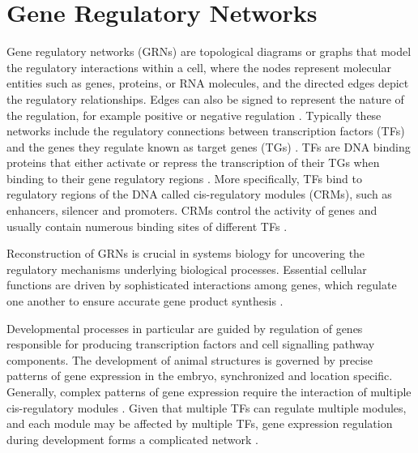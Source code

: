 \section{Gene Regulatory Networks}
Gene regulatory networks (GRNs) are topological diagrams or graphs that model the regulatory interactions within a cell, 
where the nodes represent molecular entities such as genes, proteins, or RNA molecules, 
and the directed edges depict the regulatory relationships. 
Edges can also be signed to represent the nature of the regulation, for example positive or negative regulation 
\cite{Wilczynski2010, mercatelli2020gene}. 
Typically these networks include  the regulatory connections between transcription factors (TFs) and the genes they 
regulate known as target genes (TGs) \cite{Wilczynski2010}. 
TFs are DNA binding proteins that either activate or repress the transcription of their TGs when binding to their gene 
regulatory regions \cite{latchman1993transcription}. 
More specifically, TFs bind to regulatory regions of the DNA called cis-regulatory modules (CRMs), 
such as enhancers, silencer and promoters. 
CRMs control the activity of genes and usually contain numerous binding sites of different TFs 
\cite{levine2005gene, small1992regulation, davidson2001genomic}.  

Reconstruction of GRNs is crucial in systems biology for uncovering the regulatory mechanisms underlying 
biological processes. Essential cellular functions are driven by sophisticated interactions among genes, 
which regulate one another to ensure accurate gene product synthesis  \cite{chai2014review}. 

Developmental processes in particular are guided by regulation of genes responsible for producing transcription 
factors and cell signalling pathway components.
The development of animal structures is governed by precise patterns of gene expression in the embryo, 
synchronized and location specific. Generally, complex patterns of gene expression require the interaction of 
multiple cis-regulatory modules \cite{levine2005gene, gray1994short}. Given that multiple TFs can regulate multiple modules, 
and each module may be affected by multiple TFs, gene expression regulation during development forms a complicated network 
\cite{levine2005gene}.

